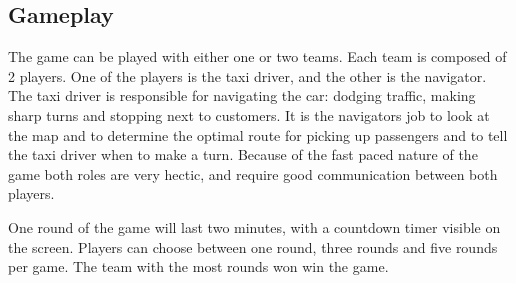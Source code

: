 \documentclass{article}
\begin{document}
\subsection*{Gameplay}
The game can be played with either one or two teams. Each team is composed of 2 players. One of the players is the taxi driver, and the other is the navigator. The taxi driver is responsible for navigating the car: dodging traffic, making sharp turns and stopping next to customers. It is the navigators job to look at the map and to determine the optimal route for picking up passengers and to tell the taxi driver when to make a turn. Because of the fast paced nature of the game both roles are very hectic, and require good communication between both players.

One round of the game will last two minutes, with a countdown timer visible on the screen. Players can choose between one round, three rounds and five rounds per game. The team with the most rounds won win the game.
   
\end{document}

